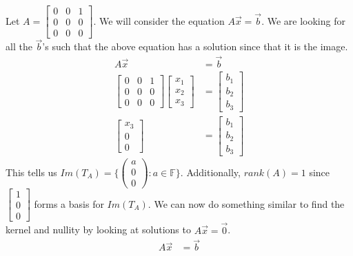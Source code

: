\begin{example}
    Let $A=\begin{bmatrix}
        0 & 0 & 1\\
        0 & 0 & 0\\
        0 & 0 & 0
    \end{bmatrix}$. We will consider the equation $A\vec{x}=\vec{b}$. We are looking for all the $\vec{b}$'s such that the above equation has a solution since that it is the image.
    \begin{align*}
        A\vec{x}&=\vec{b}\\
        \begin{bmatrix}
        0 & 0 & 1\\
        0 & 0 & 0\\
        0 & 0 & 0
    \end{bmatrix}\begin{bmatrix}
        x_1 \\ x_2 \\ x_3
    \end{bmatrix}&=\begin{bmatrix}
        b_1 \\ b_2 \\ b_3
    \end{bmatrix}\\
    \begin{bmatrix}
        x_3 \\ 0 \\ 0
    \end{bmatrix}&=\begin{bmatrix}
        b_1 \\ b_2 \\ b_3
    \end{bmatrix}
    \end{align*}
    This tells us $Im(T_A)=\{\begin{pmatrix}
        a \\ 0 \\ 0
    \end{pmatrix}:a\in\mathbb{F}\}$. Additionally, $rank(A)=1$ since $\begin{bmatrix}
        1 \\ 0 \\ 0
    \end{bmatrix}$ forms a basis for $Im(T_A)$. We can now do something similar to find the kernel and nullity by looking at solutions to $A\vec{x}=\vec{0}$.
    \begin{align*}
        A\vec{x}&=\vec{b}\\

\end{align*}
\end{example}
